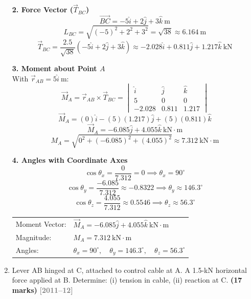 \documentclass[12pt,a3paper]{article}
\newcommand{\yr}[1]{\hfill\textcolor{gray}{\small\textbf{[#1]}}}
\newcommand{\mk}[1]{\textcolor{orange!70!black}{\small\textbf{(#1 marks)}}}
\begin{document}
\begin{enumerate}
\begin{tcolorbox}[enhanced,breakable,ansbox,colback=cD!4,colframe=cD,
  boxrule=0.8pt,arc=5pt,
  title={\textbf{Solution}},fonttitle=\bfseries\color{white},
  colbacktitle=cD]
\medskip
\textbf{2. Force Vector ($\vec{T}_{BC}$)}\\[4pt]
\[
  \vec{BC} = -5\hat{i} + 2\hat{j} + 3\hat{k}\ \text{m}
\]
\[
  L_{BC} = \sqrt{(-5)^2 + 2^2 + 3^2} = \sqrt{38} \approx 6.164\ \text{m}
\]
\[
  \vec{T}_{BC} = \frac{2.5}{\sqrt{38}}\left(-5\hat{i} + 2\hat{j} + 3\hat{k}\right)
              \approx -2.028\hat{i} + 0.811\hat{j} + 1.217\hat{k}\ \text{kN}
\]

\medskip
\textbf{3. Moment about Point $A$}\\[4pt]
With $\vec{r}_{AB} = 5\hat{i}\ \text{m}$:
\[
  \vec{M}_A = \vec{r}_{AB} \times \vec{T}_{BC} =
  \begin{vmatrix}
    \hat{i} & \hat{j} & \hat{k} \\
    5       & 0       & 0       \\
   -2.028   & 0.811   & 1.217
  \end{vmatrix}
\]
\[
  \vec{M}_A = (0)\hat{i} - (5)(1.217)\hat{j} + (5)(0.811)\hat{k}
\]
\[
  \vec{M}_A = -6.085\hat{j} + 4.055\hat{k}\ \text{kN}\!\cdot\!\text{m}
\]
\[
  M_A = \sqrt{0^2 + (-6.085)^2 + (4.055)^2} \approx \boxed{7.312\ \text{kN}\!\cdot\!\text{m}}
\]

\medskip
\textbf{4. Angles with Coordinate Axes}\\[4pt]
\[
  \cos\theta_x = \frac{0}{7.312} = 0
  \implies \theta_x = 90^\circ
\]
\[
  \cos\theta_y = \frac{-6.085}{7.312} \approx -0.8322
  \implies \theta_y \approx 146.3^\circ
\]
\[
  \cos\theta_z = \frac{4.055}{7.312} \approx 0.5546
  \implies \theta_z \approx 56.3^\circ
\]

\medskip
\begin{center}
\begin{tabular}{ll}
  Moment Vector: & $\vec{M}_A = -6.085\hat{j} + 4.055\hat{k}\ \text{kN}\!\cdot\!\text{m}$ \\[4pt]
  Magnitude:     & $M_A = 7.312\ \text{kN}\!\cdot\!\text{m}$ \\[4pt]
  Angles:        & $\theta_x = 90^\circ,\quad \theta_y = 146.3^\circ,\quad \theta_z = 56.3^\circ$
\end{tabular}
\end{center}

\end{tcolorbox}

\item \label{qlabel:B1-Q31}
Lever AB hinged at C, attached to control cable at A. A 1.5-kN horizontal force applied at B. Determine: (i) tension in cable, (ii) reaction at C. \mk{17}
\yr{2011--12}


\end{enumerate}
\end{document}
